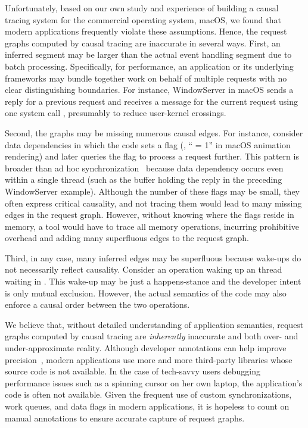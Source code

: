 Unfortunately, based on our own study and experience of building a causal
tracing system for the commercial operating system, macOS, we found that modern
applications frequently violate these assumptions. Hence, the request graphs
computed by causal tracing are inaccurate in several ways. First, an inferred
segment may be larger than the actual event handling segment due to batch
processing. Specifically, for performance, an application or its underlying
frameworks may bundle together work on behalf of multiple requests with no clear
distinguishing boundaries. For instance, WindowServer in macOS sends a reply
for a previous request and receives a message for the current request using one
system call , presumably to reduce user-kernel
crossings.

Second, the graphs may be missing numerous causal edges. For instance, consider
data dependencies in which the code sets a flag (\eg, `` = 1''
in macOS animation rendering) and later queries the flag to process a request
further. This pattern is broader than ad hoc synchronization~\cite{xiong2010ad}
because data dependency occurs even within a single thread (such as the buffer
holding the reply in the preceding WindowServer example). Although the number of
these flags may be small, they often express critical causality, and not tracing
them would lead to many missing edges in the request graph. However, without
knowing where the flags reside in memory, a tool would have to trace all memory
operations, incurring prohibitive overhead and adding many superfluous edges to
the request graph.

Third, in any case, many inferred edges may be superfluous because wake-ups do
not necessarily reflect causality. Consider an  operation waking up
an thread waiting in . This wake-up may be just a happens-stance and
the developer intent is only mutual exclusion. However, the actual semantics of
the code may also enforce a causal order between the two operations.

We believe that, without detailed understanding of application semantics,
request graphs computed by causal tracing are \emph{inherently} inaccurate
and both over- and under-approximate reality. Although developer annotations
can help improve precision~\cite{reynolds2006pip, fonseca2007x}, modern
applications use more and more third-party libraries whose source code is not
available. In the case of tech-savvy users debugging performance issues such
as a spinning cursor on her own laptop, the application's code is often not
available. Given the frequent use of custom synchronizations, work queues, and
data flags in modern applications, it is hopeless to count on manual annotations
to ensure accurate capture of request graphs.

